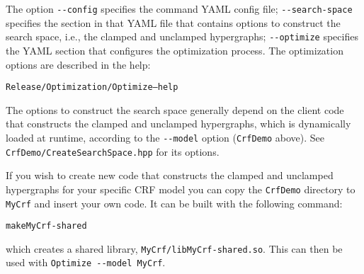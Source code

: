 \documentclass[12pt]{article}
\newcommand{\code}[1]{\texttt{#1}}
\begin{document}
The option \code{-{}-config} specifies the command YAML config file;
\code{-{}-search-space} specifies the section in that YAML file that
contains options to construct the search space, i.e., the clamped and
unclamped hypergraphs; \code{-{}-optimize} specifies the YAML section
that configures the optimization process. The optimization options are
described in the help:

\begin{mdframed}\footnotesize\begin{alltt}
Release/Optimization/Optimize --help
\end{alltt}\end{mdframed}

The options to construct the search space generally depend on the
client code that constructs the clamped and unclamped hypergraphs,
which is dynamically loaded at runtime, according to the
\code{-{}-model} option (\code{CrfDemo} above). See
\code{CrfDemo/CreateSearchSpace.hpp} for its options.

If you wish to create new code that constructs the clamped and
unclamped hypergraphs for your specific CRF model you can copy the
\code{CrfDemo} directory to \code{MyCrf} and insert your own code. It
can be built with the following command:

\begin{mdframed}\footnotesize\begin{alltt}
make MyCrf-shared
\end{alltt}\end{mdframed}

which creates a shared library, \code{MyCrf/libMyCrf-shared.so}. This
can then be used with \code{Optimize -{}-model MyCrf}.

% 


\end{document}
